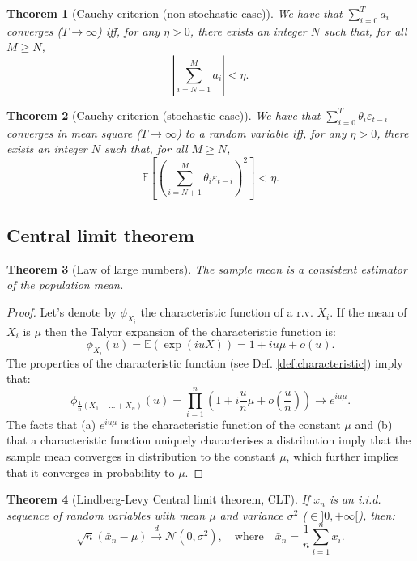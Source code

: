 \documentclass[
  12pt,
]{book}
\newtheorem{theorem}{Theorem}[chapter]
\theoremstyle{definition}
\theoremstyle{definition}
\theoremstyle{definition}
\theoremstyle{definition}
\theoremstyle{remark}
\begin{document}
\begin{theorem}[Cauchy criterion (non-stochastic case)]
\protect\hypertarget{thm:cauchycritstatic}{}\label{thm:cauchycritstatic}We have that \(\sum_{i=0}^{T} a_i\) converges (\(T \rightarrow \infty\)) iff, for any \(\eta > 0\), there exists an integer \(N\) such that, for all \(M\ge N\),
\[
\left|\sum_{i=N+1}^{M} a_i\right| < \eta.
\]
\end{theorem}

\begin{theorem}[Cauchy criterion (stochastic case)]
\protect\hypertarget{thm:cauchycritstochastic}{}\label{thm:cauchycritstochastic}We have that \(\sum_{i=0}^{T} \theta_i \varepsilon_{t-i}\) converges in mean square (\(T \rightarrow \infty\)) to a random variable iff, for any \(\eta > 0\), there exists an integer \(N\) such that, for all \(M\ge N\),
\[
\mathbb{E}\left[\left(\sum_{i=N+1}^{M} \theta_i \varepsilon_{t-i}\right)^2\right] < \eta.
\]
\end{theorem}

\hypertarget{central-limit-theorem}{%
\subsection{Central limit theorem}\label{central-limit-theorem}}

\begin{theorem}[Law of large numbers]
\protect\hypertarget{thm:LLNappendix}{}\label{thm:LLNappendix}The sample mean is a consistent estimator of the population mean.
\end{theorem}

\begin{proof}
Let's denote by \(\phi_{X_i}\) the characteristic function of a r.v. \(X_i\). If the mean of \(X_i\) is \(\mu\) then the Talyor expansion of the characteristic function is:
\[
\phi_{X_i}(u) = \mathbb{E}(\exp(iuX)) = 1 + iu\mu + o(u).
\]
The properties of the characteristic function (see Def. \ref{def:characteristic}) imply that:
\[
\phi_{\frac{1}{n}(X_1+\dots+X_n)}(u) = \prod_{i=1}^{n} \left(1 + i\frac{u}{n}\mu + o\left(\frac{u}{n}\right) \right) \rightarrow e^{iu\mu}.
\]
The facts that (a) \(e^{iu\mu}\) is the characteristic function of the constant \(\mu\) and (b) that a characteristic function uniquely characterises a distribution imply that the sample mean converges in distribution to the constant \(\mu\), which further implies that it converges in probability to \(\mu\).
\end{proof}

\begin{theorem}[Lindberg-Levy Central limit theorem, CLT]
\protect\hypertarget{thm:LindbergLevyCLT}{}\label{thm:LindbergLevyCLT}If \(x_n\) is an i.i.d. sequence of random variables with mean \(\mu\) and variance \(\sigma^2\) (\(\in ]0,+\infty[\)), then:
\[
\boxed{\sqrt{n} (\bar{x}_n - \mu) \overset{d}{\rightarrow} \mathcal{N}(0,\sigma^2), \quad \mbox{where} \quad \bar{x}_n = \frac{1}{n} \sum_{i=1}^{n} x_i.}
\]
\end{theorem}
\end{document}
